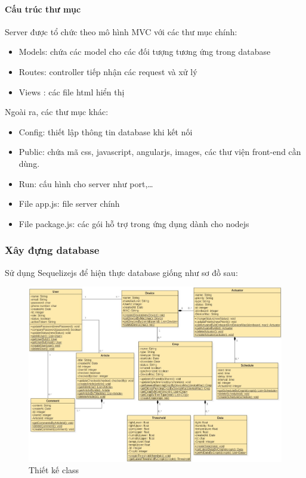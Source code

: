 \documentclass[a4paper,12pt,oneside]{article}
\begin{document}
\paragraph{Cấu trúc thư mục}

Server được tổ chức theo mô hình MVC với các thư mục chính:
\begin{itemize}
\item Models: chứa các model cho các đối tượng tương ứng trong database
\item Routes: controller tiếp nhận các request và xử lý
\item Views : các file html hiển thị
\end{itemize}

Ngoài ra, các thư mục khác:
\begin{itemize}
\item Config: thiết lập thông tin database khi kết nối
\item Public: chứa mã css, javascript, angularjs, images, các thư viện front-end cần dùng.
\item Run: cấu hình cho server như port,…
\item File app.js: file server chính
\item File package.js: các gói hỗ trợ trong ứng dụng dành cho nodejs
\end{itemize}
\subsubsection{Xây đựng database}
\noindent Sử dụng Sequelizejs để hiện thực database giống như sơ đồ sau:
\begin{landscape}
\begin{center}
\begin{figure}[b]
\begin{center}
\includegraphics[scale=0.62]{hinh/class_diagram.jpg}
\end{center}
\caption{ Thiết kế class}
\label{xyz}
\end{figure}
\end{center}
\end{landscape}
\end{document}

